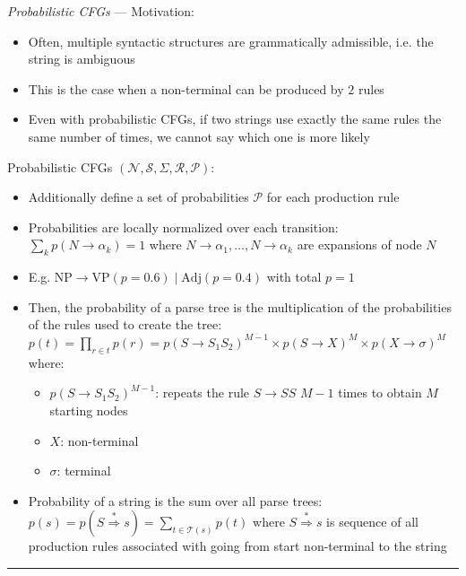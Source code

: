 \emph{Probabilistic CFGs} ---
Motivation:
\begin{itemize}
    \item Often, multiple syntactic structures are grammatically admissible, i.e. the string is ambiguous
    \item This is the case when a non-terminal can be produced by $2$ rules
    \item Even with probabilistic CFGs, if two strings use exactly the same rules the same number of times, we cannot say which one is more likely
\end{itemize}
Probabilistic CFGs $(\mathcal{N}, \mathcal{S}, \Sigma, \mathcal{R}, \mathcal{P})$:
\begin{itemize}
    \item Additionally define a set of probabilities $\mathcal{P}$ for each production rule
    \item Probabilities are locally normalized over each transition:
    $
    \sum_{k} p(N \to \alpha_k) = 1
    $
    where $N \to \alpha_1, \dots, N \to \alpha_k$ are expansions of node $N$
    \item E.g.
    $
    \text{NP} \to \text{VP} (p = 0.6) \mid \text{Adj} (p = 0.4)
    $
    with total $p = 1$
    \item Then, the probability of a parse tree is the multiplication of the probabilities of the rules used to create the tree:
    $
    p(t) = \prod_{r \in t} p(r) = p(S \to S_1 S_2)^{M-1} \times p(S \to X)^M \times p(X \to \sigma)^M
    $
    where:
    \begin{itemize}
        \item $p(S \to S_1 S_2)^{M-1}$: repeats the rule $S \to SS$ $M-1$ times to obtain $M$ starting nodes
        \item $X$: non-terminal
        \item $\sigma$: terminal
    \end{itemize}
    \item Probability of a string is the sum over all parse trees: $p(s) = p(S \stackrel{*}{\Rightarrow} s) = \sum_{t \in \mathcal{T}(s)} p(t)$ where $S \stackrel{*}{\Rightarrow} s$ is sequence of all production rules associated with going from start non-terminal to the string
\end{itemize}

{\color{lightgray}\hrule height 0.001mm}

